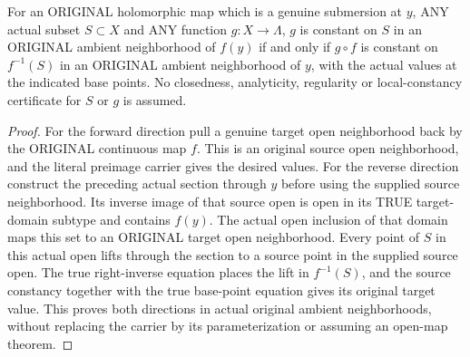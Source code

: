 \begin{theorem}
\label{hir:original-submersion-actual-carrier-function-neighborhood-equivalence}
\leanok
For an ORIGINAL holomorphic map which is a genuine submersion at $y$,
ANY actual subset $S\subset X$ and ANY function $g:X\to\Lambda$, $g$ is
constant on $S$ in an ORIGINAL ambient neighborhood of $f(y)$ if and
only if $g\circ f$ is constant on $f^{-1}(S)$ in an ORIGINAL ambient
neighborhood of $y$, with the actual values at the indicated base points.
No closedness, analyticity, regularity or local-constancy certificate for
$S$ or $g$ is assumed.
\end{theorem}
\begin{proof}
For the forward direction pull a genuine target open neighborhood back
by the ORIGINAL continuous map $f$. This is an original source open
neighborhood, and the literal preimage carrier gives the desired values.
For the reverse direction construct the preceding actual section through
$y$ before using the supplied source neighborhood. Its inverse image of
that source open is open in its TRUE target-domain subtype and contains
$f(y)$. The actual open inclusion of that domain maps this set to an
ORIGINAL target open neighborhood. Every point of $S$ in this actual
open lifts through the section to a source point in the supplied source
open. The true right-inverse equation places the lift in $f^{-1}(S)$,
and the source constancy together with the true base-point equation
gives its original target value. This proves both directions in actual
original ambient neighborhoods, without replacing the carrier by its
parameterization or assuming an open-map theorem.
\end{proof}

